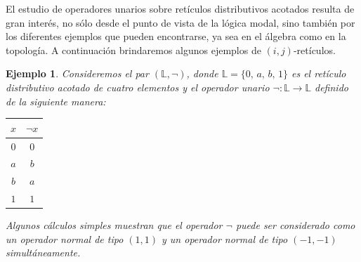 \documentclass[12pt]{book}
\newtheorem{example}{Ejemplo}
\begin{document}
El estudio de operadores unarios sobre retículos distributivos acotados resulta de gran interés, no sólo desde el punto de vista de la lógica modal, sino también por los diferentes ejemplos que pueden encontrarse, ya sea en el álgebra como en la topología. A continuación brindaremos algunos ejemplos de $(i,j)$-retículos.

\begin{example} \label{Ex 1} Consideremos el par \((\mathbb{L}, \neg)\), donde \(\mathbb{L} = \{0,\, a,\, b,\, 1\}\) es el retículo distributivo acotado de cuatro elementos y el operador unario \( \neg: \mathbb{L} \to \mathbb{L}\) definido de la siguiente manera:

\begin{center}
\begin{tabular}{c|c}
$x$  & \( \neg x \)  \tabularnewline 
\hline
$0$  & $0$     \tabularnewline
$a$  & $b$     \tabularnewline
$b$  & $a$     \tabularnewline
$1$  & $1$     \tabularnewline
\end{tabular}
\end{center}

Algunos cálculos simples muestran que el operador $\neg$ puede ser considerado como un operador normal de tipo $(1,1)$ y un operador normal de tipo $(-1,-1)$ simultáneamente.

\centering
{}
\end{example}
\end{document}

